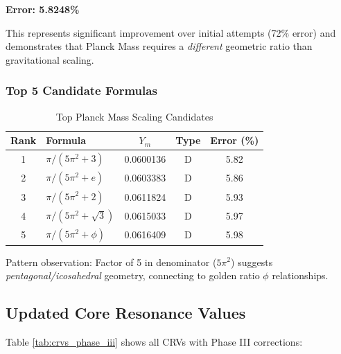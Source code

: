 \documentclass[11pt,a4paper]{article}
\begin{document}
\textbf{Error: 5.8248\%}

This represents significant improvement over initial attempts (72\% error) and demonstrates that Planck Mass requires a \emph{different} geometric ratio than gravitational scaling.

\subsubsection{Top 5 Candidate Formulas}

\begin{table}[H]
\centering
\caption{Top Planck Mass Scaling Candidates}
\begin{tabular}{@{}clccc@{}}
\toprule
Rank & Formula & $Y_m$ & Type & Error (\%) \\ \midrule
1 & $\pi/(5\pi^2 + 3)$ & 0.0600136 & D & 5.82 \\
2 & $\pi/(5\pi^2 + e)$ & 0.0603383 & D & 5.86 \\
3 & $\pi/(5\pi^2 + 2)$ & 0.0611824 & D & 5.93 \\
4 & $\pi/(5\pi^2 + \sqrt{3})$ & 0.0615033 & D & 5.97 \\
5 & $\pi/(5\pi^2 + \phi)$ & 0.0616409 & D & 5.98 \\
\bottomrule
\end{tabular}
\label{tab:planck_candidates}
\end{table}

Pattern observation: Factor of 5 in denominator ($5\pi^2$) suggests \emph{pentagonal/icosahedral} geometry, connecting to golden ratio $\phi$ relationships.

\subsection{Updated Core Resonance Values}

Table \ref{tab:crvs_phase_iii} shows all CRVs with Phase III corrections:
\end{document}
